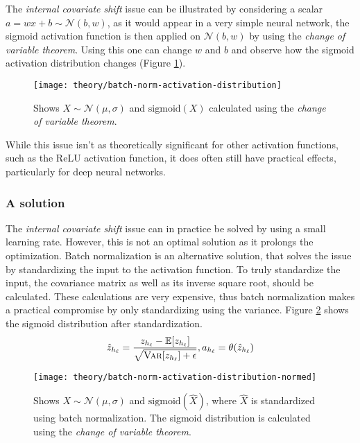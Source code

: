 The \textit{internal covariate shift} issue can be illustrated by considering a scalar $a = w x + b \sim \mathcal{N}(b, w)$, as it would appear in a very simple neural network, the sigmoid activation function is then applied on $\mathcal{N}(b, w)$ by using the \textit{change of variable theorem}. Using this one can change $w$ and $b$ and observe how the sigmoid activation distribution changes (Figure \ref{fig:convergence:batch-norm:activation-distribution}).

\begin{figure}[h]
	\centering
	\texttt{[image: theory/batch-norm-activation-distribution]}
	\caption{Shows $X \sim \mathcal{N}(\mu, \sigma)$ and $\mathrm{sigmoid}(X)$ calculated using the \textit{change of variable theorem}.}
	\label{fig:convergence:batch-norm:activation-distribution}
\end{figure}

While this issue isn't as theoretically significant for other activation functions, such as the ReLU activation function, it does often still have practical effects, particularly for deep neural networks.

\subsubsection{A solution}
The \textit{internal covariate shift} issue can in practice be solved by using a small learning rate. However, this is not an optimal solution as it prolongs the optimization. Batch normalization is an alternative solution, that solves the issue by standardizing the input to the activation function. To truly standardize the input, the covariance matrix as well as its inverse square root, should be calculated. These calculations are very expensive, thus batch normalization makes a practical compromise by only standardizing using the variance. Figure \ref{fig:convergence:batch-norm:activation-distribution-normed} shows the sigmoid distribution after standardization.
\begin{equation}
\hat{z}_{h_\ell} = \frac{z_{h_\ell} - \mathbb{E}[z_{h_\ell}]}{\sqrt{\textsc{Var}[z_{h_\ell}] + \epsilon}}, a_{h_\ell} = \theta(\hat{z}_{h_\ell})
\end{equation}

\begin{figure}[h]
	\centering
	\texttt{[image: theory/batch-norm-activation-distribution-normed]}
	\caption{Shows $X \sim \mathcal{N}(\mu, \sigma)$ and $\mathrm{sigmoid}(\hat{X})$, where $\hat{X}$ is standardized using batch normalization. The sigmoid distribution is calculated using the \textit{change of variable theorem}.}
	\label{fig:convergence:batch-norm:activation-distribution-normed}
\end{figure}

